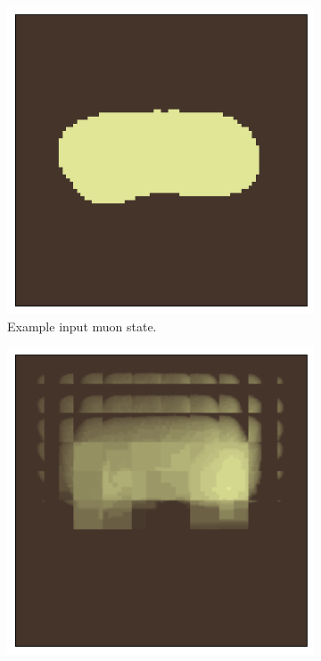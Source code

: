 \begin{figure}[t!]
    \centering
    \begin{subfigure}[t]{0.32\linewidth}
        \centering
        \includegraphics[width=0.9\linewidth]{figures/ivae/muon/muon-obs-state.png}
        \caption{Example input muon state.}
        \label{fig:muon_obs_state}
    \end{subfigure}
    \hfill
    \begin{subfigure}[t]{0.32\linewidth}
        \centering
        \includegraphics[width=0.9\linewidth]{figures/ivae/muon/muon-obs-simulated.png}

\end{subfigure}
\end{figure}
